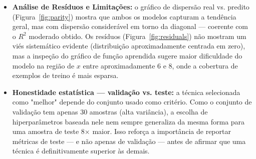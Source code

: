 \documentclass[11pt,a4paper]{article}
\begin{document}
\begin{itemize}
\begin{itemize}
    \end{itemize}
    \item \textbf{Análise de Resíduos e Limitações:} o gráfico de dispersão real vs. predito (Figura~\ref{fig:parity}) mostra que ambos os modelos capturam a tendência geral, mas com dispersão considerável em torno da diagonal — coerente com o $R^2$ moderado obtido. Os resíduos (Figura~\ref{fig:residuals}) não mostram um viés sistemático evidente (distribuição aproximadamente centrada em zero), mas a inspeção do gráfico de função aprendida sugere maior dificuldade do modelo na região de $x$ entre aproximadamente 6 e 8, onde a cobertura de exemplos de treino é mais esparsa.
    \item \textbf{Honestidade estatística — validação vs. teste:} a técnica selecionada como "melhor" depende do conjunto usado como critério. Como o conjunto de validação tem apenas 30 amostras (alta variância), a escolha de hiperparâmetros baseada nele nem sempre generaliza da mesma forma para uma amostra de teste 8$\times$ maior. Isso reforça a importância de reportar métricas de teste — e não apenas de validação — antes de afirmar que uma técnica é definitivamente superior às demais.
\end{itemize}
\end{document}
